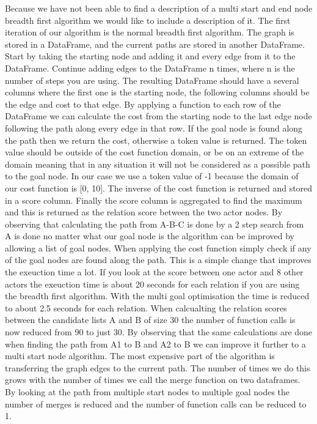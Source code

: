 Because we have not been able to find a description of a multi start and end node breadth first algorithm we would like to include a description of it. The first iteration of our algorithm is the normal breadth first algorithm. The graph is stored in a DataFrame, and the current paths are stored in another DataFrame. Start by taking the starting node and adding it and every edge from it to the DataFrame. Continue adding edges to the DataFrame n times, where n is the number of steps you are using. The resulting DataFrame should have a several columns where the first one is the starting node, the following columns should be the edge and cost to that edge. By applying a function to each row of the DataFrame we can calculate the cost from the starting node to the last edge node following the path along every edge in that row. If the goal node is found along the path then we return the cost, otherwise a token value is returned. The token value should be outside of the cost function domain, or be on an extreme of the domain meaning that in any situation it will not be considered as a possible path to the goal node. In our case we use a token value of -1 because the domain of our cost function is [0, 10]. The inverse of the cost function is returned and stored in a score column. Finally the score column is aggregated to find the maximum and this is returned as the relation score between the two actor nodes. By observing that calculating the path from A-B-C is done by a 2 step search from A is done no matter what our goal node is the algorithm can be improved by allowing a list of goal nodes. When applying the cost function simply check if any of the goal nodes are found along the path. This is a simple change that improves the exeuction time a lot. If you look at the score between one actor and 8 other actors the exeuction time is about 20 seconds for each relation if you are using the breadth first algorithm. With the multi goal optimisation the time is reduced to about 2.5 seconds for each relation. When calcualting the relation scores between the candidate lists A and B of size 30 the number of function calls is now reduced from 90 to just 30. By observing that the same calculations are done when finding the path from A1 to B and A2 to B we can improve it further to a multi start node algorithm. The most expensive part of the algorithm is transferring the graph edges to the current path. The number of times we do this grows with the number of times we call the merge function on two dataframes. By looking at the path from multiple start nodes to multiple goal nodes the number of merges is reduced and the number of function calls can be reduced to 1.

